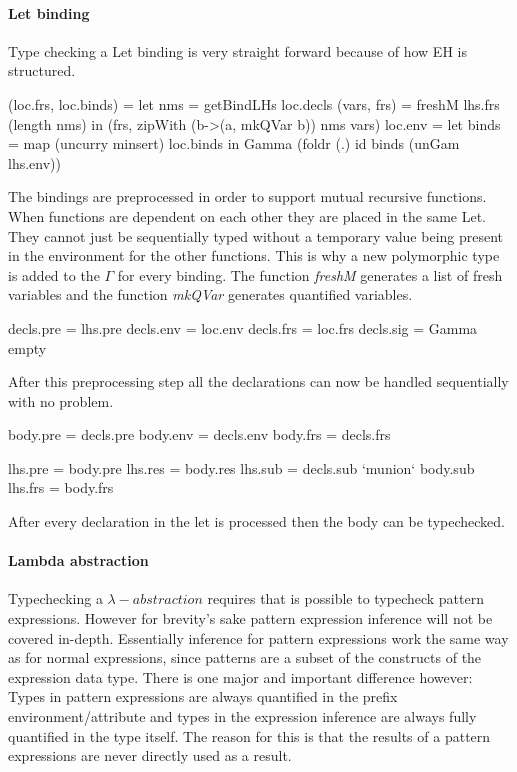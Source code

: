 \paragraph{Let binding}
Type checking a Let binding is very straight forward because of how EH is structured.

\begin{code}
(loc.frs, loc.binds)  =  let  nms          = getBindLHs loc.decls
                              (vars, frs)  = freshM lhs.frs (length nms)
                         in (frs, zipWith (\a b->(a, mkQVar b)) nms vars)
loc.env   =  let binds = map (uncurry minsert) loc.binds 
             in Gamma (foldr (.) id binds (unGam lhs.env))
\end{code}
The bindings are preprocessed in order to support mutual recursive functions. When functions are dependent on each other they are placed in the same Let. They cannot just be sequentially typed without a temporary value being present in the environment for the other functions. This is why a new polymorphic type is added to the $\Gamma$ for every binding. The function \emph{freshM} generates a list of fresh variables and the function \emph{mkQVar} generates quantified variables.

\begin{code}
decls.pre  = lhs.pre
decls.env  = loc.env
decls.frs  = loc.frs
decls.sig  = Gamma empty
\end{code}
After this preprocessing step all the declarations can now be handled sequentially with no problem.

\begin{code}
body.pre  = decls.pre
body.env  = decls.env 
body.frs  = decls.frs

lhs.pre   = body.pre
lhs.res   = body.res
lhs.sub   = decls.sub `munion` body.sub
lhs.frs   = body.frs
\end{code}
After every declaration in the let is processed then the body can be typechecked.

\paragraph{Lambda abstraction}
Typechecking a $\lambda-abstraction$ requires that is possible to typecheck pattern expressions. However for brevity's sake pattern expression inference will not be covered in-depth. Essentially inference for pattern expressions work the same way as for normal expressions, since patterns are a subset of the constructs of the expression data type. There is one major and important difference however: Types in pattern expressions are always quantified in the prefix environment/attribute and types in the expression inference are always fully quantified in the type itself. The reason for this is that the results of a pattern expressions are never directly used as a result.

